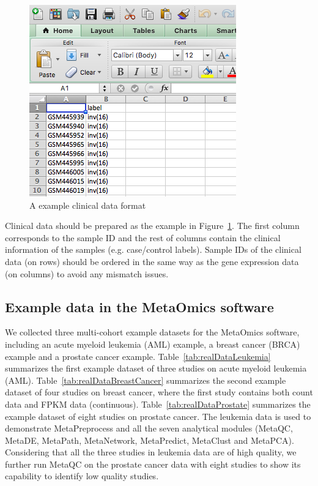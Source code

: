 \begin{figure}
\includegraphics[scale=0.5]{./figure/dataPreparation/clinicalData}
\caption{A example clinical data format}
\label{fig:clinical}
\end{figure}

Clinical data should be prepared as the example in Figure~\ref{fig:clinical}.
The first column corresponds to the sample ID and the rest of columns contain the clinical information of the samples (e.g. case/control labels). Sample IDs of the clinical data (on rows) should be ordered in the same way as the gene expression data (on columns) to avoid any mismatch issues.  


\subsection{Example data in the MetaOmics software}


We collected three multi-cohort example datasets for the MetaOmics software, 
including an acute myeloid leukemia (AML) example,
a breast cancer (BRCA) example and a prostate cancer example.
Table~\ref{tab:realDataLeukemia} summarizes the first example dataset of three studies on acute myeloid leukemia (AML).
Table~\ref{tab:realDataBreastCancer} summarizes the second example dataset of four studies on breast cancer, where the first study contains both count data and FPKM data (continuous).
Table~\ref{tab:realDataProstate} summarizes the example dataset of eight studies on prostate cancer.
The leukemia data is used to demonstrate MetaPreprocess and all the seven analytical modules (MetaQC, MetaDE, MetaPath, MetaNetwork, MetaPredict, MetaClust and MetaPCA). 
Considering that all the three studies in leukemia data are of high quality, we further run MetaQC on the prostate cancer data with eight studies to show its capability to identify low quality studies. 


